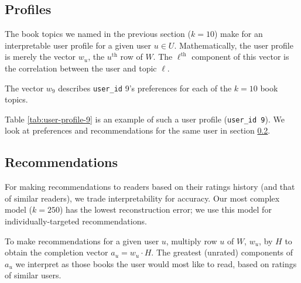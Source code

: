 \documentclass[11pt]{article}
\begin{document}



\newpage




    \hypertarget{profiles}{%
\subsection{Profiles}\label{profiles}}





The book topics we named in the previous section ($k=10$) make for an interpretable user profile for a given user $u \in U$.
Mathematically, the user profile is merely the vector $w_u$, the $u^{\text{th}}$ row of $W$.
The $\ell^{\text{th}}$ component of this vector is the correlation between the user and topic $\ell$.
\begin{table}
\vspace{-0pt}
\centering
  
  \caption[User Profile]{The vector $w_9$ describes \texttt{user\_id} 9's preferences for each of the $k=10$ book topics.}
  \label{tab:user-profile-9}
  \vspace{-30pt}
\end{table}
Table \ref{tab:user-profile-9} is an example of such a user profile (\texttt{user\_id 9}).
We look at preferences and recommendations for the same user in section \ref{recommendations}.



    \hypertarget{recommendations}{%
\subsection{Recommendations}\label{recommendations}}


For making recommendations to readers based on their ratings history (and that of similar readers), we trade interpretability for accuracy. 
Our most complex model ($k=250$) has the lowest reconstruction error; we use this model for individually-targeted recommendations. 

To make recommendations for a given user $u$, multiply row $u$ of $W$, $w_u$, by $H$ to obtain the completion vector $a_u = w_u \cdot H$. 
The greatest (unrated) components of $a_u$ we interpret as those books the user would most like to read, based on ratings of similar users.
\end{document}
